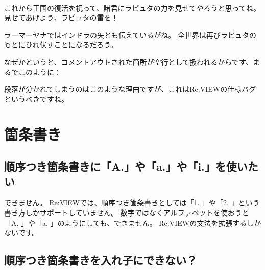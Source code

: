 \begin{starterprogram}\end{starterprogram}
\noindent
{}\\

これから王国の復活を祝って、諸君にラピュタの力を見せてやろうと思ってね。
見せてあげよう、ラピュタの雷を！

ラーマーヤナではインドラの矢とも伝えているがね。
全世界は再びラピュタのもとにひれ伏すことになるだろう。

\vspace*{\baselineskip}

なぜかというと、コメントアウトされた箇所が空行として扱われるからです、まるでこのように：

\begin{starterprogram}\end{starterprogram}

段落が分かれてしまうのはこのような理由ですが、これはRe:VIEWの仕様バグというべきですね。

\section{箇条書き}
\label{sec:2-2}

\subsection{順序つき箇条書きに「A.」や「a.」や「i.」を使いたい}
\label{sec:2-2-1}

できません。
Re:VIEWでは、順序つき箇条書きとしては「1. 」や「2. 」という書き方しかサポートしていません。
数字ではなくアルファベットを使おうと「A. 」や「a. 」のようにしても、できません。
Re:VIEWの文法を拡張するしかないです。

\subsection{順序つき箇条書きを入れ子にできない？}
\label{sec:2-2-2}

